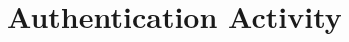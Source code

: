 \section{Authentication Activity}

\begin{lstlisting}[style=sourceCode, language=JAVA, caption=This is code, label=lst:authenticationAcitivity] 

\end{lstlisting}